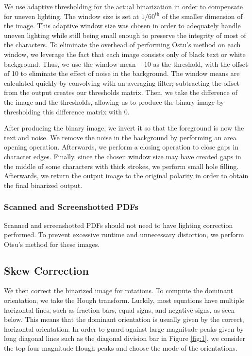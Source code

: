 \documentclass[journal]{IEEEtran}
\begin{document}
We use adaptive thresholding for the actual binarization in order to compensate for uneven lighting. The window size is set at $1/60^{\text{th}}$ of the smaller dimension of the image. This adaptive window size was chosen in order to adequately handle uneven lighting while still being small enough to preserve the integrity of most of the characters. To eliminate the overhead of performing Ostu’s method on each window, we leverage the fact that each image consists only of black text or white background. Thus, we use the $\text{window mean}-10$ as the threshold, with the offset of 10 to eliminate the effect of noise in the background. The window means are calculated quickly by convolving with an averaging filter; subtracting the offset from the output creates our thresholds matrix. Then, we take the difference of the image and the thresholds, allowing us to produce the binary image by thresholding this difference matrix with $0$.

After producing the binary image, we invert it so that the foreground is now the text and noise. We remove the noise in the background by performing an area opening operation. Afterwards, we perform a closing operation to close gaps in character edges. Finally, since the chosen window size may have created gaps in the middle of some characters with thick strokes, we perform small hole filling. Afterwards, we return the output image to the original polarity in order to obtain the final binarized output.

\subsubsection{Scanned and Screenshotted PDFs}
 Scanned and screenshotted PDFs should not need to have lighting correction performed. To prevent excessive runtime and unnecessary distortion, we perform Otsu’s method for these images.
 
 \subsection{Skew Correction}
 We then correct the binarized image for rotations. To compute the dominant orientation, we take the Hough transform. Luckily, most equations have multiple horizontal lines, such as fraction bars, equal signs, and negative signs, as seen below. This means that the dominant orientation is usually given by the correct, horizontal orientation. In order to guard against large magnitude peaks given by long diagonal lines such as the diagonal division bar in Figure \ref{fig:1}, we consider the top four magnitude Hough peaks and choose the mode of the orientations. 
 
\end{document}
